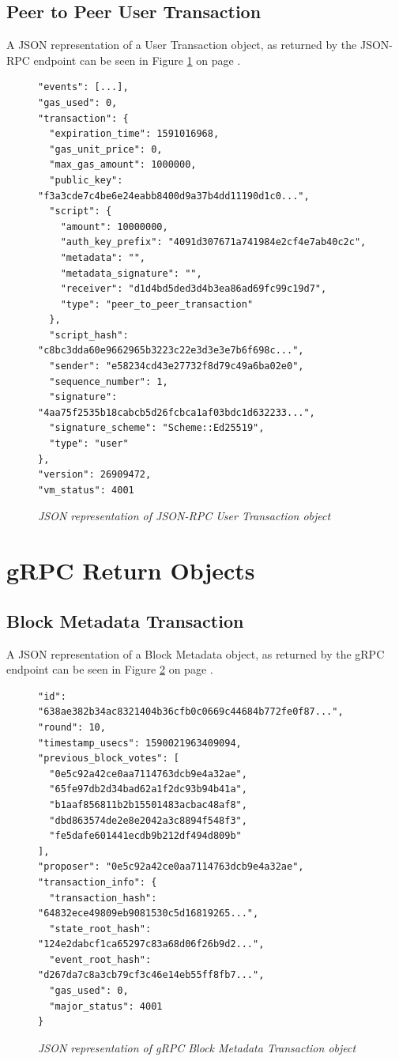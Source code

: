\documentclass[12pt,openany,a4paper]{book}
\begin{document}
\subsection{Peer to Peer User Transaction}
\label{appendix:json_txns:p2p}
A JSON representation of a User Transaction object, as returned by the JSON-RPC
endpoint can be seen in Figure \ref{json_rpc_p2p} on page \pageref{json_rpc_p2p}.
\begin{figure}[h!]
    \caption{\sl JSON representation of JSON-RPC User Transaction object}
    \centering
    \label{json_rpc_p2p}

\begin{verbatim}
"events": [...],
"gas_used": 0,
"transaction": {
  "expiration_time": 1591016968,
  "gas_unit_price": 0,
  "max_gas_amount": 1000000,
  "public_key": "f3a3cde7c4be6e24eabb8400d9a37b4dd11190d1c0...",
  "script": {
    "amount": 10000000,
    "auth_key_prefix": "4091d307671a741984e2cf4e7ab40c2c",
    "metadata": "",
    "metadata_signature": "",
    "receiver": "d1d4bd5ded3d4b3ea86ad69fc99c19d7",
    "type": "peer_to_peer_transaction"
  },
  "script_hash": "c8bc3dda60e9662965b3223c22e3d3e3e7b6f698c...",
  "sender": "e58234cd43e27732f8d79c49a6ba02e0",
  "sequence_number": 1,
  "signature": "4aa75f2535b18cabcb5d26fcbca1af03bdc1d632233...",
  "signature_scheme": "Scheme::Ed25519",
  "type": "user"
},
"version": 26909472,
"vm_status": 4001
\end{verbatim}
\end{figure}

\section{gRPC Return Objects}
\subsection{Block Metadata Transaction}
A JSON representation of a Block Metadata object, as returned by the gRPC
endpoint can be seen in Figure \ref{grpc_bm} on page \pageref{grpc_bm}.
\begin{figure}[h!]
    \caption{\sl JSON representation of gRPC Block Metadata Transaction object}
    \centering
    \label{grpc_bm}

\begin{verbatim}
"id": "638ae382b34ac8321404b36cfb0c0669c44684b772fe0f87...",
"round": 10,
"timestamp_usecs": 1590021963409094,
"previous_block_votes": [
  "0e5c92a42ce0aa7114763dcb9e4a32ae",
  "65fe97db2d34bad62a1f2dc93b94b41a",
  "b1aaf856811b2b15501483acbac48af8",
  "dbd863574de2e8e2042a3c8894f548f3",
  "fe5dafe601441ecdb9b212df494d809b"
],
"proposer": "0e5c92a42ce0aa7114763dcb9e4a32ae",
"transaction_info": {
  "transaction_hash": "64832ece49809eb9081530c5d16819265...",
  "state_root_hash": "124e2dabcf1ca65297c83a68d06f26b9d2...",
  "event_root_hash": "d267da7c8a3cb79cf3c46e14eb55ff8fb7...",
  "gas_used": 0,
  "major_status": 4001
}
\end{verbatim}
\end{figure}
\end{document}
